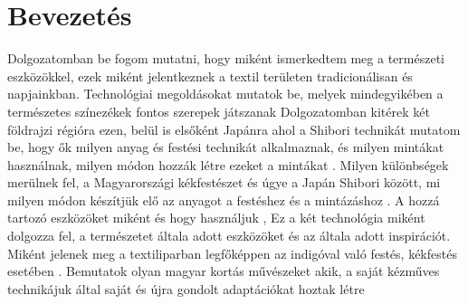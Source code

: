 \chapter{Bevezetés}
Dolgozatomban be fogom mutatni, hogy miként ismerkedtem  meg a természeti eszközökkel, ezek  miként jelentkeznek a textil területen tradicionálisan és napjainkban.
Technológiai megoldásokat mutatok be, melyek mindegyikében a természetes színezékek fontos szerepek játszanak
Dolgozatomban kitérek két földrajzi régióra ezen, belül is elsőként Japánra ahol a Shibori technikát mutatom be, hogy ők milyen anyag és festési technikát alkalmaznak, és milyen mintákat használnak, milyen módon hozzák létre ezeket a mintákat .
Milyen különbségek merülnek fel, a Magyarországi kékfestészet és úgye a Japán Shibori között, mi milyen módon készítjük elő az anyagot a festéshez és a mintázáshoz .
A hozzá tartozó eszközöket miként és hogy használjuk , 
Ez a két technológia miként dolgozza fel, a természetet általa adott eszközöket és az általa adott inspirációt.
Miként jelenek meg a textiliparban legfőképpen az indigóval való festés, kékfestés esetében .
Bemutatok olyan magyar kortás művészeket akik, a saját kézműves technikájuk által saját és újra gondolt adaptációkat hoztak létre 
